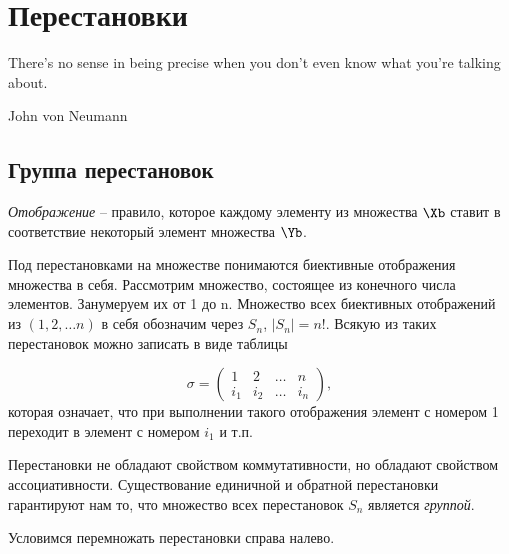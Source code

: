 \section{Перестановки}
\label{permutation}

\epigraph{There's no sense in being precise when you don't even know what you're talking about.}{John von Neumann}

\subsection{Группа перестановок}

\begin{df}
  \emph{Отображение} -- правило, которое каждому 
  элементу из множества $\Xb$ ставит в соответствие некоторый элемент множества $\Yb$. 
\end{df}


Под перестановками на множестве понимаются биективные отображения множества в себя. Рассмотрим множество, состоящее из конечного числа элементов. Занумеруем их от 1 до n. Множество всех биективных отображений из $(1,2,\dots n)$ в себя обозначим через $S_n$, $|S_n|=n!$. Всякую из таких перестановок можно записать в виде таблицы

$$\sigma =\left(\begin{array}{cccc}1&2&\dots&n\\i_1&i_2&\dots& i_n\end{array}\right),$$
которая означает, что при выполнении такого отображения элемент с номером 1 переходит в элемент с номером $i_1$ и т.п.

Перестановки не обладают свойством коммутативности, но обладают свойством ассоциативности. Существование единичной и обратной перестановки гарантируют нам то, что множество всех перестановок $S_n$ является \emph{группой}.

Условимся перемножать перестановки справа налево.

